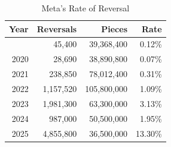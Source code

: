 \begin{table}[!t]
\caption*{
{\large Meta’s Rate of Reversal}
} 

\fontsize{12.0pt}{14.4pt}\selectfont

\begin{tabular*}{\linewidth}{@{\extracolsep{\fill}}rrrr}
\toprule
Year & Reversals & Pieces & Rate \\ 
\midrule\addlinespace[2.5pt]
2019 & 45,400 & 39,368,400 & 0.12\% \\
2020 & 28,690 & 38,890,800 & 0.07\% \\
2021 & 238,850 & 78,012,400 & 0.31\% \\
2022 & 1,157,520 & 105,800,000 & 1.09\% \\
2023 & 1,981,300 & 63,300,000 & 3.13\% \\
2024 & 987,000 & 50,500,000 & 1.95\% \\
2025 & 4,855,800 & 36,500,000 & 13.30\% \\
\bottomrule
\end{tabular*}

\end{table}
